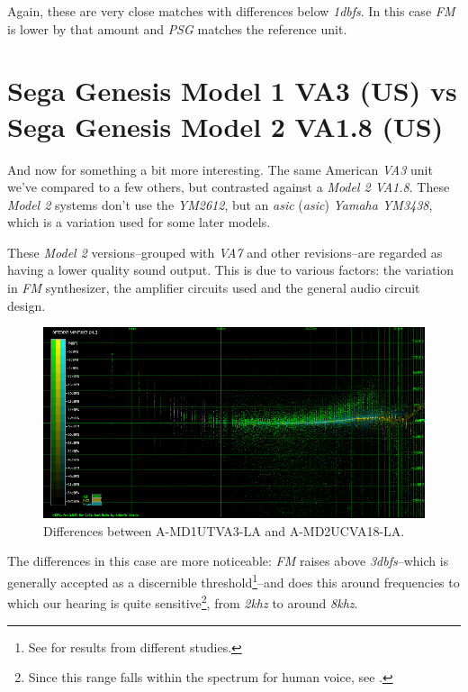 \documentclass[10pt,a4paper]{report}
\newcommand{\define}[1]{\textit{\acrlong{#1}} (\textit{\acrshort{#1}})}
\newcommand{\khz}[1]{\textit{#1\acrshort{khz}}}
\newcommand{\db}[1]{\textit{#1\acrshort{dbfs}}}
\begin{document}
Again, these are very close matches with differences below \db{1}. In this case \textit{FM} is lower by that amount and \textit{PSG} matches the reference unit.

\section{Sega Genesis Model 1 VA3 (US) vs\\ Sega Genesis Model 2 VA1.8 (US)}

And now for something a bit more interesting. The same American \textit{VA3} unit we've compared to a few others, but contrasted against a \textit{Model 2 VA1.8}. These \textit{Model 2} systems don't use the \textit{YM2612}, but an \define{asic} \textit{Yamaha YM3438}, which is a variation used for some later models.

These \textit{Model 2} versions--grouped with \textit{VA7} and other revisions--are regarded as having a lower quality sound output. This is due to various factors: the variation in \textit{FM} synthesizer, the amplifier circuits used and the general audio circuit design.

\begin{figure}[H]
	\centering
	\includegraphics[width=1.0\linewidth]{images/results/5-1-A-MD1UTVA3-LA_vs_A-MD2UCVA18-LA.png}
	\caption[A-MD1UTVA3-LA vs A-MD2UCVA18-LA]{Differences between A-MD1UTVA3-LA and A-MD2UCVA18-LA.}
	\label{fig:A-MD1UTVA3-LA_vs_A-MD2UCVA18-LA}
\end{figure}

The differences in this case are more noticeable: \textit{FM} raises above \db{3}--which is generally accepted as a discernible threshold\footnote{See \cite{dbdiff} for results from different studies.}--and does this around frequencies to which our hearing is quite sensitive\footnote{Since this range falls within the spectrum for human voice, see \cite{humanvoice}.}, from \khz{2} to around \khz{8}.
\end{document}
